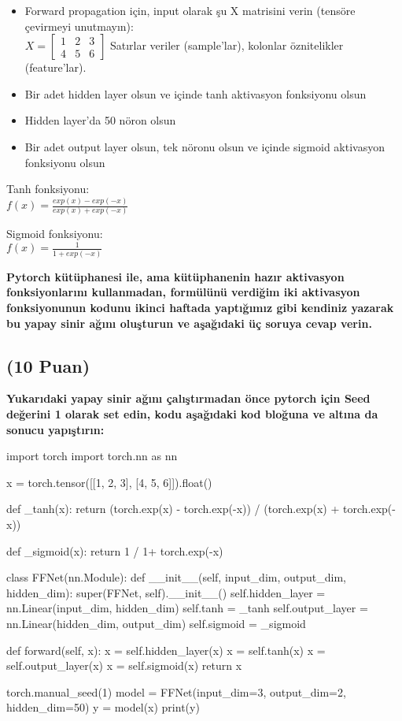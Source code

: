\documentclass[11pt]{article}
\begin{document}
\begin{itemize}
    \item Forward propagation için, input olarak şu X matrisini verin (tensöre çevirmeyi unutmayın):\\
    $X = \begin{bmatrix}
        1 & 2 & 3\\
        4 & 5 & 6
        \end{bmatrix}$
    Satırlar veriler (sample'lar), kolonlar öznitelikler (feature'lar).
    \item Bir adet hidden layer olsun ve içinde tanh aktivasyon fonksiyonu olsun
    \item Hidden layer'da 50 nöron olsun
    \item Bir adet output layer olsun, tek nöronu olsun ve içinde sigmoid aktivasyon fonksiyonu olsun
\end{itemize}

Tanh fonksiyonu:\\
$f(x) = \frac{exp(x) - exp(-x)}{exp(x) + exp(-x)}$
\vspace{.2in}

Sigmoid fonksiyonu:\\
$f(x) = \frac{1}{1 + exp(-x)}$

\vspace{.2in}
 \textbf{Pytorch kütüphanesi ile, ama kütüphanenin hazır aktivasyon fonksiyonlarını kullanmadan, formülünü verdiğim iki aktivasyon fonksiyonunun kodunu ikinci haftada yaptığımız gibi kendiniz yazarak bu yapay sinir ağını oluşturun ve aşağıdaki üç soruya cevap verin.}

\subsection{(10 Puan)} \textbf{Yukarıdaki yapay sinir ağını çalıştırmadan önce pytorch için Seed değerini 1 olarak set edin, kodu aşağıdaki kod bloğuna ve altına da sonucu yapıştırın:}

\begin{python}
import torch
import torch.nn as nn

x = torch.tensor([[1, 2, 3], [4, 5, 6]]).float()

def _tanh(x):
    return (torch.exp(x) - torch.exp(-x)) / (torch.exp(x) + torch.exp(-x))
    
def _sigmoid(x):
    return 1 / 1+ torch.exp(-x)



class FFNet(nn.Module):
    def __init__(self, input_dim, output_dim, hidden_dim):
        super(FFNet, self).__init__()
        self.hidden_layer = nn.Linear(input_dim, hidden_dim)
        self.tanh = _tanh 
        self.output_layer = nn.Linear(hidden_dim, output_dim)
        self.sigmoid = _sigmoid
        
    def forward(self, x):
        x = self.hidden_layer(x)
        x = self.tanh(x)
        x = self.output_layer(x)
        x = self.sigmoid(x)
        return x

torch.manual_seed(1)
model = FFNet(input_dim=3, output_dim=2, hidden_dim=50)
y = model(x)
print(y)
\end{python}
\end{document}
